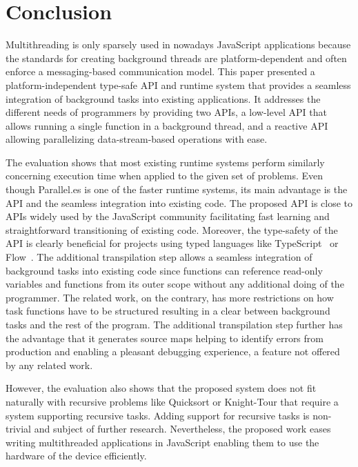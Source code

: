 \section{Conclusion}\label{sec:conclusion}
Multithreading is only sparsely used in nowadays JavaScript applications because the standards for creating background threads are platform-dependent and often enforce a messaging-based communication model. This paper presented a platform-independent type-safe API and runtime system that provides a seamless integration of background tasks into existing applications. It addresses the different needs of programmers by providing two APIs, a low-level API that allows running a single function in a background thread, and a reactive API allowing parallelizing data-stream-based operations with ease. 

The evaluation shows that most existing runtime systems perform similarly concerning execution time when applied to the given set of problems. Even though Parallel.es is one of the faster runtime systems, its main advantage is the API and the seamless integration into existing code. The proposed API is close to APIs widely used by the JavaScript community facilitating fast learning and straightforward transitioning of existing code. Moreover, the type-safety of the API is clearly beneficial for projects using typed languages like TypeScript~\cite{typescript} or Flow~\cite{flow}. The additional transpilation step allows a seamless integration of background tasks into existing code since functions can reference read-only variables and functions from its outer scope without any additional doing of the programmer. The related work, on the contrary, has more restrictions on how task functions have to be structured resulting in a clear between background tasks and the rest of the program. The additional transpilation step further has the advantage that it generates source maps helping to identify errors from production and enabling a pleasant debugging experience, a feature not offered by any related work. 

However, the evaluation also shows that the proposed system does not fit naturally with recursive problems like Quicksort or Knight-Tour that require a system supporting recursive tasks. Adding support for recursive tasks is non-trivial and subject of further research. Nevertheless, the proposed work eases writing multithreaded applications in JavaScript enabling them to use the hardware of the device efficiently.